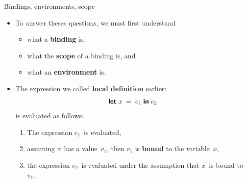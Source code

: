 \documentclass[compress,dvipdfmx]{beamer}
\begin{document}
%
\begin{frame}{Bindings, environments, scope}

  \begin{itemize}

    \item To answer theses questions, we must first understand
      \begin{itemize}

        \item what a \textbf{binding} is,

        \item what the \textbf{scope} of a binding is, and

        \item what an \textbf{environment} is.
      \end{itemize}

    \item The expression we called \textbf{local definition} earlier:
      \begin{equation*}
        \textsf{\textbf{let}} \; x \; = \; e_1 \; \textsf{\textbf{in}} \; e_2
      \end{equation*}
      is evaluated as follows:
      \begin{enumerate}

        \item The expression \(e_1\)~is evaluated,

        \item assuming it has a value~\(v_1\), then \(v_1\) is
          \textbf{bound} to the variable~\(x\),

        \item the expression \(e_2\)~is evaluated under the assumption
          that \(x\)~is bound to~\(v_1\).

      \end{enumerate}

  \end{itemize}

\end{frame}
\end{document}

